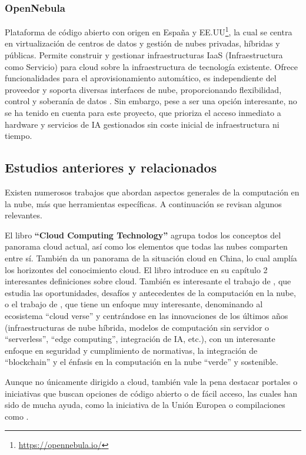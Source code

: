 \subsubsection*{OpenNebula}
Plataforma de código abierto con origen en España y EE.UU\footnote{\url{https://opennebula.io/}}, la cual se centra en virtualización de centros de datos y gestión de nubes privadas, híbridas y públicas. Permite construir y gestionar infraestructuras IaaS (Infraestructura como Servicio) para cloud sobre la infraestructura de tecnología existente. Ofrece funcionalidades para el aprovisionamiento automático, es independiente del proveedor y soporta diversas interfaces de nube, proporcionando flexibilidad, control y soberanía de datos \citep{OpenNebula2014Kumar, PrivateIaaSComparative2016}. Sin embargo, pese a ser una opción interesante, no se ha tenido en cuenta para este proyecto, que prioriza el acceso inmediato a hardware y servicios de IA gestionados sin coste inicial de infraestructura ni tiempo. \\

\subsection{Estudios anteriores y relacionados}

Existen numerosos trabajos que abordan aspectos generales de la computación en la nube, más que herramientas específicas. A continuación se revisan algunos relevantes.

El libro \textbf{``Cloud Computing Technology''} \citep{huawei2023cloud} agrupa todos los conceptos del panorama cloud actual, así como los elementos que todas las nubes comparten entre sí. También da un panorama de la situación cloud en China, lo cual amplía los horizontes del conocimiento cloud. 
El libro \citep{Fowdur2021} introduce en su capítulo 2 interesantes definiciones sobre cloud. También es interesante el trabajo de \citep{nigro2022}, que estudia las oportunidades, desafíos y antecedentes de la computación en la nube, o el trabajo de \citep{bommala2024}, que tiene un enfoque muy interesante, denominando al ecosistema ``cloud verse'' y centrándose en las innovaciones de los últimos años (infraestructuras de nube híbrida, modelos de computación sin servidor o ``serverless'', ``edge computing'', integración de IA, etc.), con un interesante enfoque en seguridad y cumplimiento de normativas, la integración de ``blockchain'' y el énfasis en la computación en la nube ``verde'' y sostenible.

Aunque no únicamente dirigido a cloud, también vale la pena destacar portales o iniciativas que buscan opciones de código abierto o de fácil acceso, las cuales han sido de mucha ayuda, como la iniciativa de la Unión Europea \citep{EuropeanAlternatives} o compilaciones como \citep{free-for-dev}.

